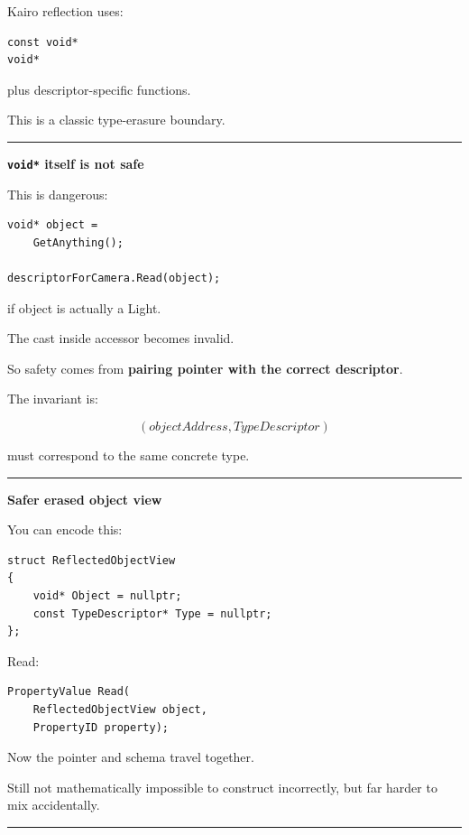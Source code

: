 Kairo reflection uses:

\begin{verbatim}
const void*
void*
\end{verbatim}

plus descriptor-specific functions.

This is a classic type-erasure boundary.

\begin{center}\rule{0.5\linewidth}{0.5pt}\end{center}

\textbf{\texttt{void*} itself is not safe}

This is dangerous:

\begin{verbatim}
void* object =
    GetAnything();

descriptorForCamera.Read(object);
\end{verbatim}

if object is actually a Light.

The cast inside accessor becomes invalid.

So safety comes from \textbf{pairing pointer with the correct descriptor}.

The invariant is:

\[
\boxed{
(objectAddress,TypeDescriptor)
}
\]

must correspond to the same concrete type.

\begin{center}\rule{0.5\linewidth}{0.5pt}\end{center}

\textbf{Safer erased object view}

You can encode this:

\begin{verbatim}
struct ReflectedObjectView
{
    void* Object = nullptr;
    const TypeDescriptor* Type = nullptr;
};
\end{verbatim}

Read:

\begin{verbatim}
PropertyValue Read(
    ReflectedObjectView object,
    PropertyID property);
\end{verbatim}

Now the pointer and schema travel together.

Still not mathematically impossible to construct incorrectly, but far harder to mix accidentally.

\begin{center}\rule{0.5\linewidth}{0.5pt}\end{center}

